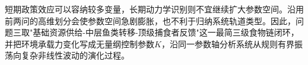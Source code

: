 短期政策效应可以容纳较多变量，长期动力学识别则不宜继续扩大参数空间。沿用前两问的高维划分会使参数空间急剧膨胀，也不利于归纳系统轨道类型。因此，问题三取"基础资源供给-中层鱼类转移-顶级捕食者反馈"这一最简三级食物链闭环，并把环境承载力变化写成无量纲控制参数$K$，沿同一参数轴分析系统从规则有界振荡向复杂非线性波动的演化过程。